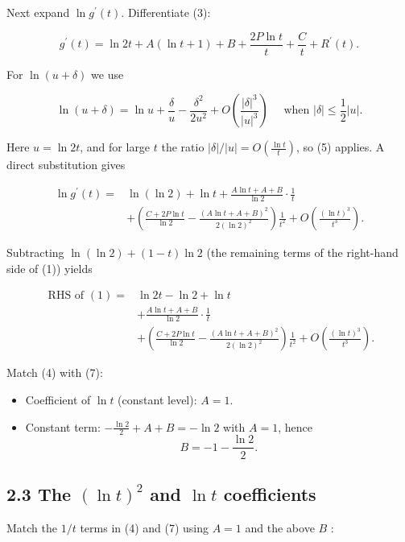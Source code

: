 \documentclass[10pt]{article}
\begin{document}
Next expand $\ln g^{\prime}(t)$. Differentiate (3):

$$
g^{\prime}(t)=\ln 2 t+A(\ln t+1)+B+\frac{2 P \ln t}{t}+\frac{C}{t}+R^{\prime}(t) .
$$

For $\ln (u+\delta)$ we use


\begin{equation*}
\ln (u+\delta)=\ln u+\frac{\delta}{u}-\frac{\delta^{2}}{2 u^{2}}+O\left(\frac{|\delta|^{3}}{|u|^{3}}\right) \quad \text { when }|\delta| \leq \frac{1}{2}|u| . \tag{5}
\end{equation*}


Here $u=\ln 2 t$, and for large $t$ the ratio $|\delta| /|u|=O\left(\frac{\ln t}{t}\right)$, so (5) applies. A direct substitution gives


\begin{align*}
\ln g^{\prime}(t)= & \ln (\ln 2)+\ln t+\frac{A \ln t+A+B}{\ln 2} \cdot \frac{1}{t} \\
& +\left(\frac{C+2 P \ln t}{\ln 2}-\frac{(A \ln t+A+B)^{2}}{2(\ln 2)^{2}}\right) \frac{1}{t^{2}}+O\left(\frac{(\ln t)^{3}}{t^{3}}\right) . \tag{6}
\end{align*}


Subtracting $\ln (\ln 2)+(1-t) \ln 2$ (the remaining terms of the right-hand side of (1)) yields


\begin{align*}
\text { RHS of }(1)= & \ln 2 t-\ln 2+\ln t \\
& +\frac{A \ln t+A+B}{\ln 2} \cdot \frac{1}{t}  \tag{7}\\
& +\left(\frac{C+2 P \ln t}{\ln 2}-\frac{(A \ln t+A+B)^{2}}{2(\ln 2)^{2}}\right) \frac{1}{t^{2}}+O\left(\frac{(\ln t)^{3}}{t^{3}}\right) .
\end{align*}


Match (4) with (7):

\begin{itemize}
  \item[-] Coefficient of $\ln t$ (constant level): $A=1$.
  \item[-] Constant term: $-\frac{\ln 2}{2}+A+B=-\ln 2$ with $A=1$, hence
$$
B=-1-\frac{\ln 2}{2} .
$$
\end{itemize}

\subsection*{2.3 The $(\ln t)^{2}$ and $\ln t$ coefficients}
Match the $1 / t$ terms in (4) and (7) using $A=1$ and the above $B$ :
\end{document}
